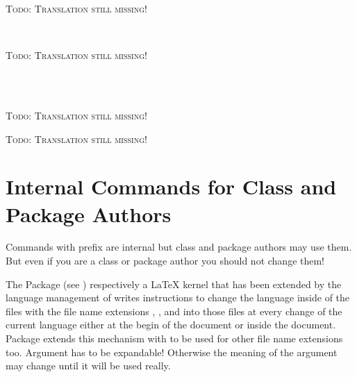 \begin{Declaration}
\end{Declaration}
%
\textsc{Todo: Translation still missing!}%
%

\begin{Declaration}
                               \\
\end{Declaration}
%
%
\textsc{Todo: Translation still missing!}%
%
%

\begin{Declaration}
  \\
  \\
\end{Declaration}
%
%
%
\textsc{Todo: Translation still missing!}%
%
%
%

\begin{Declaration}
\end{Declaration}
%
\textsc{Todo: Translation still missing!}%
%
%


\section{Internal Commands for Class and Package Authors}
\label{sec:tocbasic.internals}

Commands with prefix  are internal but class and package
authors may use them. But even if you are a class or package author you
should not change them!

\begin{Declaration}
\end{Declaration}
%
The Package  (see \cite{package:babel})
respectively a \LaTeX{} kernel that has been extended by the language
management of  writes instructions to change the language
inside of the files with the file name extensions , , and
 into those files at every change of the current language either at
the begin of the document or inside the document. Package 
extends this mechanism with  to be used for other
file name extensions too. Argument  has to be expandable!
Otherwise the meaning of the argument may change until it will be used really.

